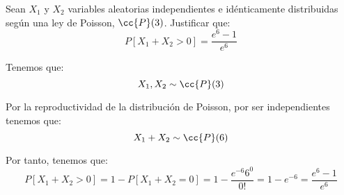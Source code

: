 \documentclass[12pt]{article}
\begin{document}
    \begin{ejercicio}[0.25 puntos]
        Sean $X_1$ y $X_2$ variables aleatorias independientes e idénticamente distribuidas según una ley de Poisson, $\cc{P}(3)$. Justificar que:
        $$P[X_1 + X_2 > 0] = \frac{e^6 - 1}{e^6}$$

        Tenemos que:
            \begin{equation*}
                X_1, X_2 \sim \cc{P}(3)
            \end{equation*}

            Por la reproductividad de la distribución de Poisson, por ser independientes tenemos que:
            \begin{equation*}
                X_1 + X_2 \sim \cc{P}(6)
            \end{equation*}

            Por tanto, tenemos que:
            \begin{equation*}
                P[X_1 + X_2> 0] = 1 - P[X_1 + X_2= 0] = 1 - \frac{e^{-6}6^0}{0!} = 1 - e^{-6} = \frac{e^6 - 1}{e^6}
            \end{equation*}
    \end{ejercicio}
\end{document}
